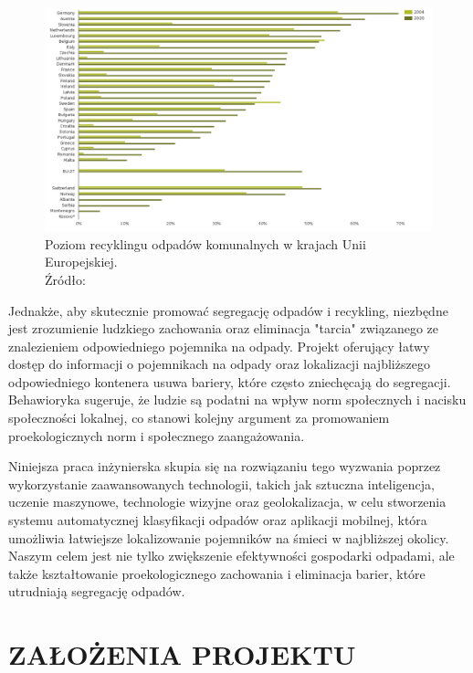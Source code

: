 \documentclass[12pt, a4paper, twoside, openany]{book}
\begin{document}
\begin{figure}[h]
    \centering\includegraphics[width=12cm]{./static/Municipal waste recycling rates in Europe by country.png}
    \caption{Poziom recyklingu odpadów komunalnych w krajach Unii Europejskiej.\\Źródło: \cite{eea-municipal}}
\end{figure}

Jednakże, aby skutecznie promować segregację odpadów i recykling, niezbędne jest zrozumienie ludzkiego zachowania oraz eliminacja "tarcia" związanego ze znalezieniem odpowiedniego pojemnika na odpady. Projekt oferujący łatwy dostęp do informacji o pojemnikach na odpady oraz lokalizacji najbliższego odpowiedniego kontenera usuwa bariery, które często zniechęcają do segregacji. Behawioryka sugeruje, że ludzie są podatni na wpływ norm społecznych i nacisku społeczności lokalnej, co stanowi kolejny argument za promowaniem proekologicznych norm i społecznego zaangażowania.

Niniejsza praca inżynierska skupia się na rozwiązaniu tego wyzwania poprzez wykorzystanie zaawansowanych technologii, takich jak sztuczna inteligencja, uczenie maszynowe, technologie wizyjne oraz geolokalizacja, w celu stworzenia systemu automatycznej klasyfikacji odpadów oraz aplikacji mobilnej, która umożliwia łatwiejsze lokalizowanie pojemników na śmieci w najbliższej okolicy. Naszym celem jest nie tylko zwiększenie efektywności gospodarki odpadami, ale także kształtowanie proekologicznego zachowania i eliminacja barier, które utrudniają segregację odpadów.

\chapter{\MakeUppercase{Założenia projektu}}
\end{document}
